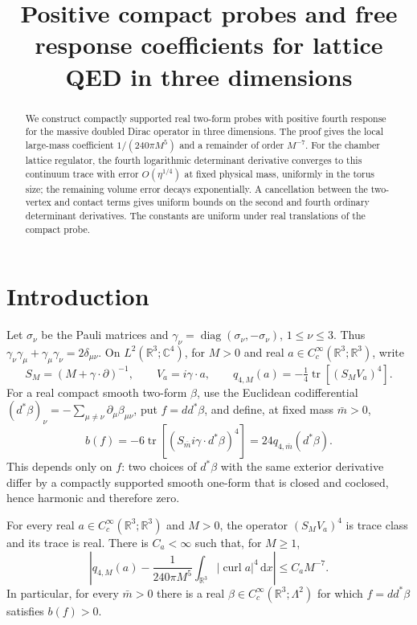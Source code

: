 \documentclass[11pt,letterpaper,reqno]{amsart}
\title[Positive probes and free Dirac response]{Positive compact probes and free response coefficients for lattice QED in three dimensions}
\date{}
\newcommand{\R}{\mathbb R}
\newcommand{\C}{\mathbb C}
\newcommand{\dd}{\mathrm d}
\DeclareMathOperator{\tr}{tr}
\DeclareMathOperator{\diag}{diag}
\begin{document}
\begin{abstract}
We construct compactly supported real two-form probes with positive
fourth response for the massive doubled Dirac operator in three
dimensions. The proof gives the local large-mass coefficient
$1/(240\pi M^5)$ and a remainder of order $M^{-7}$.
For the chamber lattice regulator, the fourth logarithmic
determinant derivative converges to this continuum trace with
error $O(\eta^{1/4})$ at fixed physical mass, uniformly in the
torus size; the remaining volume error decays exponentially.
A cancellation between the two-vertex and contact terms gives
uniform bounds on the second and fourth ordinary determinant
derivatives. The constants are uniform under real translations
of the compact probe.
\end{abstract}
\maketitle
\tableofcontents

\section{Introduction}\label{sec:introduction}

Let $\sigma_\nu$ be the Pauli matrices and
$\gamma_\nu=\diag(\sigma_\nu,-\sigma_\nu)$, $1\le\nu\le3$.
Thus $\gamma_\nu\gamma_\mu+\gamma_\mu\gamma_\nu=2\delta_{\mu\nu}$.
On $L^2(\R^3;\C^4)$, for $M>0$ and real
$a\in C_c^\infty(\R^3;\R^3)$, write
\[
 S_M=(M+\gamma\cdot\partial)^{-1},\qquad
 V_a=i\gamma\cdot a,\qquad
 q_{4,M}(a)=-\tfrac14\tr[(S_MV_a)^4].
\]
For a real compact smooth two-form $\beta$, use the Euclidean
codifferential
$(d^*\beta)_\nu=-\sum_{\mu\ne\nu}\partial_\mu\beta_{\mu\nu}$,
put $f=dd^*\beta$, and define, at fixed mass $\bar m>0$,
\begin{equation}\label{eq:positive-coefficient}
 b(f)=-6\tr[(S_{\bar m}i\gamma\cdot d^*\beta)^4]
      =24q_{4,\bar m}(d^*\beta).
\end{equation}
This depends only on $f$: two choices of $d^*\beta$ with the same
exterior derivative differ by a compactly supported smooth one-form
that is closed and coclosed, hence harmonic and therefore zero.
\begin{theorem}\label{prop:positive-probe}
For every real $a\in C_c^\infty(\R^3;\R^3)$ and $M>0$,
the operator $(S_MV_a)^4$ is trace class and its trace is real. There
is $C_a<\infty$ such that, for $M\ge1$,
\begin{equation}\label{eq:large-mass-quartic}
 \left|q_{4,M}(a)-\frac1{240\pi M^5}
       \int_{\R^3}|\operatorname{curl}a|^4\,\dd x\right|
 \le C_aM^{-7}.
\end{equation}
In particular, for every $\bar m>0$ there is a real
$\beta\in C_c^\infty(\R^3;\Lambda^2)$ for which $f=dd^*\beta$ satisfies
$b(f)>0$.
\end{theorem}
\end{document}
